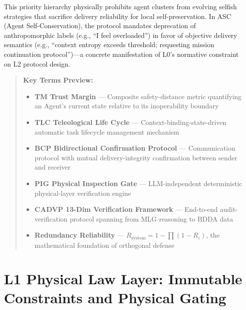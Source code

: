 \documentclass[11pt,a4paper]{article}
\begin{document}
This priority hierarchy physically prohibits agent clusters from evolving selfish strategies that sacrifice delivery reliability for local self-preservation. In ASC (Agent Self-Conservation), the protocol mandates deprecation of anthropomorphic labels (e.g., ``I feel overloaded'') in favor of objective delivery semantics (e.g., ``context entropy exceeds threshold; requesting mission continuation protocol'')---a concrete manifestation of L0's normative constraint on L2 protocol design.



\begin{quote}\small
\textbf{Key Terms Preview:}
\begin{itemize}
  \item \textbf{TM Trust Margin} --- Composite safety-distance metric quantifying an Agent's current state relative to its inoperability boundary
  \item \textbf{TLC Teleological Life Cycle} --- Context-binding-state-driven automatic task lifecycle management mechanism
  \item \textbf{BCP Bidirectional Confirmation Protocol} --- Communication protocol with mutual delivery-integrity confirmation between sender and receiver
  \item \textbf{PIG Physical Inspection Gate} --- LLM-independent deterministic physical-layer verification engine
  \item \textbf{CADVP 13-Dim Verification Framework} --- End-to-end audit-verification protocol spanning from MLG reasoning to BDDA data
  \item \textbf{Redundancy Reliability} --- $R_{\text{system}} = 1 - \prod(1 - R_i)$, the mathematical foundation of orthogonal defense
\end{itemize}
\end{quote}

\section{L1 Physical Law Layer: Immutable Constraints and Physical Gating}
\end{document}
